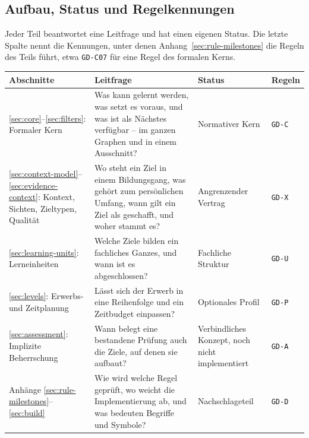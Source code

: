 \documentclass[11pt,a4paper,parskip=half,headings=normal,numbers=noenddot]{scrartcl}
\newcommand{\code}[1]{\texttt{#1}}
\begin{document}
\subsection*{Aufbau, Status und Regelkennungen}
Jeder Teil beantwortet eine Leitfrage und hat einen eigenen Status. Die
letzte Spalte nennt die Kennungen, unter denen
Anhang~\ref{sec:rule-milestones} die Regeln des Teils führt, etwa
\code{GD-C07} für eine Regel des formalen Kerns.

\begin{center}\small
\begin{tabularx}{\linewidth}{@{}P{33mm}XP{35mm}P{12mm}@{}}
\toprule
Abschnitte & Leitfrage & Status & Regeln \\
\midrule
\ref{sec:core}--\ref{sec:filters}: Formaler Kern & Was kann gelernt werden,
was setzt es voraus, und was ist als Nächstes verfügbar -- im ganzen Graphen
und in einem Ausschnitt? & Normativer Kern & \code{GD-C}\\
\ref{sec:context-model}--\ref{sec:evidence-context}: Kontext, Sichten,
Zieltypen, Qualität & Wo steht ein Ziel in einem Bildungsgang, was gehört zum
persönlichen Umfang, wann gilt ein Ziel als geschafft, und woher stammt es? &
Angrenzender Vertrag & \code{GD-X}\\
\ref{sec:learning-units}: Lerneinheiten & Welche Ziele bilden ein fachliches
Ganzes, und wann ist es abgeschlossen? & Fachliche Struktur & \code{GD-U}\\
\ref{sec:levels}: Erwerbs- und Zeitplanung & Lässt sich der Erwerb in eine
Reihenfolge und ein Zeitbudget einpassen? & Optionales Profil & \code{GD-P}\\
\ref{sec:assessment}: Implizite Beherrschung & Wann belegt eine bestandene
Prüfung auch die Ziele, auf denen sie aufbaut? & Verbindliches Konzept,
noch nicht implementiert & \code{GD-A}\\
Anhänge \ref{sec:rule-milestones}--\ref{sec:build} & Wie wird welche Regel
geprüft, wo weicht die Implementierung ab, und was bedeuten Begriffe und
Symbole? & Nachschlageteil & \code{GD-D}\\
\bottomrule
\end{tabularx}\end{center}
\end{document}
